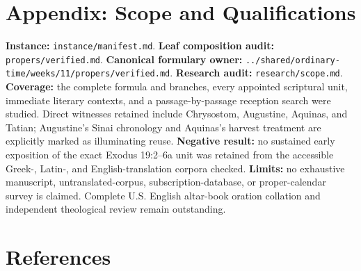 \section*{Appendix: Scope and Qualifications}

\begin{studyframe}
\textbf{Instance:} \nolinkurl{instance/manifest.md}. \textbf{Leaf composition audit:} \nolinkurl{propers/verified.md}. \textbf{Canonical formulary owner:} \nolinkurl{../shared/ordinary-time/weeks/11/propers/verified.md}. \textbf{Research audit:} \nolinkurl{research/scope.md}. \textbf{Coverage:} the complete formula and branches, every appointed scriptural unit, immediate literary contexts, and a passage-by-passage reception search were studied. Direct witnesses retained include Chrysostom, Augustine, Aquinas, and Tatian; Augustine's Sinai chronology and Aquinas's harvest treatment are explicitly marked as illuminating reuse. \textbf{Negative result:} no sustained early exposition of the exact Exodus 19:2--6a unit was retained from the accessible Greek-, Latin-, and English-translation corpora checked. \textbf{Limits:} no exhaustive manuscript, untranslated-corpus, subscription-database, or proper-calendar survey is claimed. Complete U.S. English altar-book oration collation and independent theological review remain outstanding.
\end{studyframe}

\section*{References}


